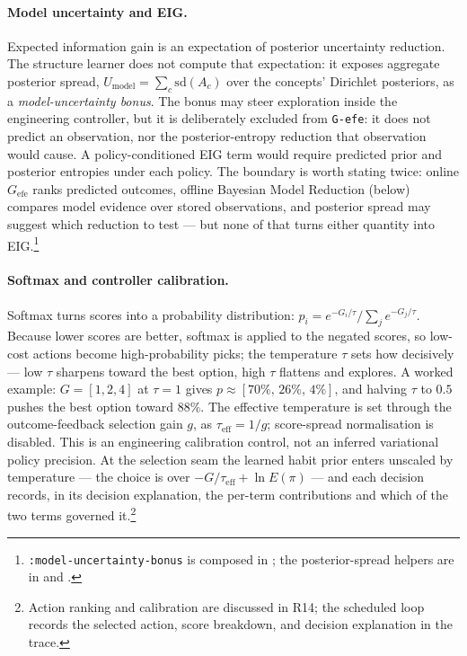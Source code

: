 \paragraph{Model uncertainty and EIG.} Expected information gain is an expectation of posterior uncertainty reduction. The structure learner does not compute that expectation: it exposes aggregate posterior spread, $U_{\mathrm{model}} = \sum_c \mathrm{sd}(A_c)$ over the concepts' Dirichlet posteriors, as a \emph{model-uncertainty bonus}. The bonus may steer exploration inside the engineering controller, but it is deliberately excluded from \texttt{G-efe}: it does not predict an observation, nor the posterior-entropy reduction that observation would cause. A policy-conditioned EIG term would require predicted prior and posterior entropies under each policy.  The boundary is worth stating twice: online $G_{\mathrm{efe}}$ ranks predicted outcomes, offline Bayesian Model Reduction (below) compares model evidence over stored observations, and posterior spread may suggest which reduction to test --- but none of that turns either quantity into EIG.\footnote{\texttt{:model-uncertainty-bonus} is composed in ; the posterior-spread helpers are in  and .}

\paragraph{Softmax and controller calibration.} Softmax turns scores into a probability distribution: $p_i = e^{-G_i/\tau}\big/\sum_j e^{-G_j/\tau}$.  Because lower scores are better, softmax is applied to the negated scores, so low-cost actions become high-probability picks; the temperature $\tau$ sets how decisively --- low $\tau$ sharpens toward the best option, high $\tau$ flattens and explores.  A worked example: $G=[1,2,4]$ at $\tau=1$ gives $p\approx[70\%,\,26\%,\,4\%]$, and halving $\tau$ to $0.5$ pushes the best option toward $88\%$. The effective temperature is set through the outcome-feedback selection gain $g$, as $\tau_{\mathrm{eff}}=1/g$; score-spread normalisation is disabled. This is an engineering calibration control, not an inferred variational policy precision.  At the selection seam the learned habit prior enters unscaled by temperature --- the choice is over $-G/\tau_{\mathrm{eff}} + \ln E(\pi)$ --- and each decision records, in its decision explanation, the per-term contributions and which of the two terms governed it.\footnote{Action ranking and calibration are discussed in R14; the scheduled loop records the selected action, score breakdown, and decision explanation in the trace.}

